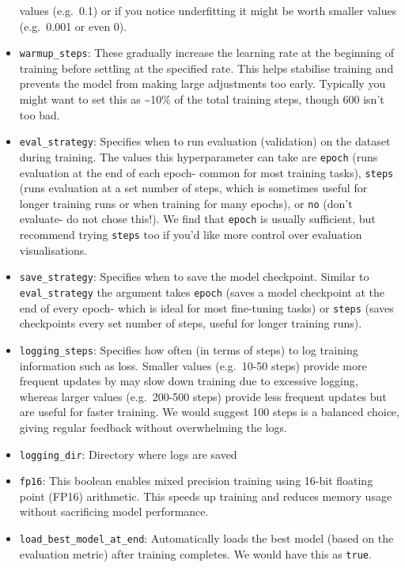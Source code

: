 \documentclass[
  letterpaper,
  DIV=11,
  numbers=noendperiod]{scrreprt}
\begin{document}
\begin{itemize}
  values (e.g.~0.1) or if you notice underfitting it might be worth
  smaller values (e.g.~0.001 or even 0).
\item
  \texttt{warmup\_steps}: These gradually increase the learning rate at
  the beginning of training before settling at the specified rate. This
  helps stabilise training and prevents the model from making large
  adjustments too early. Typically you might want to set this as
  \textasciitilde10\% of the total training steps, though 600 isn't too
  bad.
\item
  \texttt{eval\_strategy}: Specifies when to run evaluation (validation)
  on the dataset during training. The values this hyperparameter can
  take are \texttt{epoch} (runs evaluation at the end of each epoch-
  common for most training tasks), \texttt{steps} (runs evaluation at a
  set number of steps, which is sometimes useful for longer training
  runs or when training for many epochs), or \texttt{no} (don't
  evaluate- do not chose this!). We find that \texttt{epoch} is usually
  sufficient, but recommend trying \texttt{steps} too if you'd like more
  control over evaluation visualisations.
\item
  \texttt{save\_strategy}: Specifies when to save the model checkpoint.
  Similar to \texttt{eval\_strategy} the argument takes \texttt{epoch}
  (saves a model checkpoint at the end of every epoch- which is ideal
  for most fine-tuning tasks) or \texttt{steps} (saves checkpoints every
  set number of steps, useful for longer training runs).
\item
  \texttt{logging\_steps}: Specifies how often (in terms of steps) to
  log training information such as loss. Smaller values (e.g.~10-50
  steps) provide more frequent updates by may slow down training due to
  excessive logging, whereas larger values (e.g.~200-500 steps) provide
  less frequent updates but are useful for faster training. We would
  suggest 100 steps is a balanced choice, giving regular feedback
  without overwhelming the logs.
\item
  \texttt{logging\_dir}: Directory where logs are saved
\item
  \texttt{fp16}: This boolean enables mixed precision training using
  16-bit floating point (FP16) arithmetic. This speeds up training and
  reduces memory usage without sacrificing model performance.
\item
  \texttt{load\_best\_model\_at\_end}: Automatically loads the best
  model (based on the evaluation metric) after training completes. We
  would have this as \texttt{true}.

\end{itemize}
\end{document}
